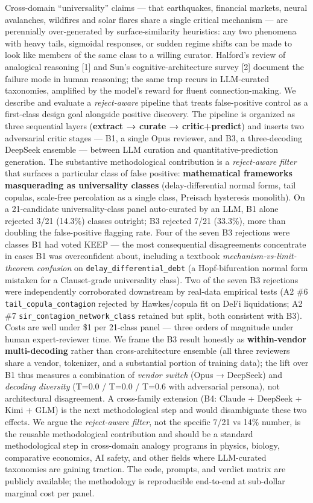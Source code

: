 \documentclass[
  letterpaper,
  11pt]{article}
\begin{document}
Cross-domain ``universality'' claims --- that earthquakes, financial
markets, neural avalanches, wildfires and solar flares share a single
critical mechanism --- are perennially over-generated by
surface-similarity heuristics: any two phenomena with heavy tails,
sigmoidal responses, or sudden regime shifts can be made to look like
members of the same class to a willing curator. Halford's review of
analogical reasoning {[}1{]} and Sun's cognitive-architecture survey
{[}2{]} document the failure mode in human reasoning; the same trap
recurs in LLM-curated taxonomies, amplified by the model's reward for
fluent connection-making. We describe and evaluate a \emph{reject-aware}
pipeline that treats false-positive control as a first-class design goal
alongside positive discovery. The pipeline is organized as three
sequential layers (\textbf{extract → curate → critic+predict}) and
inserts two adversarial critic stages --- B1, a single Opus reviewer,
and B3, a three-decoding DeepSeek ensemble --- between LLM curation and
quantitative-prediction generation. The substantive methodological
contribution is a \emph{reject-aware filter} that surfaces a particular
class of false positive: \textbf{mathematical frameworks masquerading as
universality classes} (delay-differential normal forms, tail copulas,
scale-free percolation as a single class, Preisach hysteresis monolith).
On a 21-candidate universality-class panel auto-curated by an LLM, B1
alone rejected 3/21 (14.3\%) classes outright; B3 rejected 7/21
(33.3\%), more than doubling the false-positive flagging rate. Four of
the seven B3 rejections were classes B1 had voted KEEP --- the most
consequential disagreements concentrate in cases B1 was overconfident
about, including a textbook \emph{mechanism-vs-limit-theorem confusion}
on \texttt{delay\_differential\_debt} (a Hopf-bifurcation normal form
mistaken for a Clauset-grade universality class). Two of the seven B3
rejections were independently corroborated downstream by real-data
empirical tests (A2 \#6 \texttt{tail\_copula\_contagion} rejected by
Hawkes/copula fit on DeFi liquidations; A2 \#7
\texttt{sir\_contagion\_network\_class} retained but split, both
consistent with B3). Costs are well under \$1 per 21-class panel ---
three orders of magnitude under human expert-reviewer time. We frame the
B3 result honestly as \textbf{within-vendor multi-decoding} rather than
cross-architecture ensemble (all three reviewers share a vendor,
tokenizer, and a substantial portion of training data); the lift over B1
thus measures a combination of \emph{vendor switch} (Opus → DeepSeek)
and \emph{decoding diversity} (T=0.0 / T=0.0 / T=0.6 with adversarial
persona), not architectural disagreement. A cross-family extension (B4:
Claude + DeepSeek + Kimi + GLM) is the next methodological step and
would disambiguate these two effects. We argue the \emph{reject-aware
filter}, not the specific 7/21 vs 14\% number, is the reusable
methodological contribution and should be a standard methodological step
in cross-domain analogy programs in physics, biology, comparative
economics, AI safety, and other fields where LLM-curated taxonomies are
gaining traction. The code, prompts, and verdict matrix are publicly
available; the methodology is reproducible end-to-end at sub-dollar
marginal cost per panel.
\end{document}
